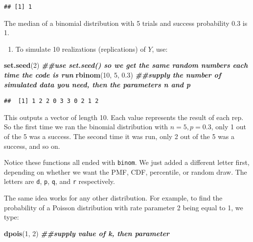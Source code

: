 \documentclass[
]{book}
\newenvironment{Shaded}{\begin{snugshade}}{\end{snugshade}}
\newcommand{\DecValTok}[1]{\textcolor[rgb]{0.00,0.00,0.81}{#1}}
\newcommand{\DocumentationTok}[1]{\textcolor[rgb]{0.56,0.35,0.01}{\textbf{\textit{#1}}}}
\newcommand{\FloatTok}[1]{\textcolor[rgb]{0.00,0.00,0.81}{#1}}
\newcommand{\FunctionTok}[1]{\textcolor[rgb]{0.13,0.29,0.53}{\textbf{#1}}}
\newcommand{\NormalTok}[1]{#1}
\providecommand{\tightlist}{%
  \setlength{\itemsep}{0pt}\setlength{\parskip}{0pt}}
\begin{document}
\begin{verbatim}
## [1] 1
\end{verbatim}

The median of a binomial distribution with 5 trials and success probability 0.3 is 1.

\begin{enumerate}
\def\labelenumi{\arabic{enumi}.}
\setcounter{enumi}{3}
\tightlist
\item
  To simulate 10 realizations (replications) of \(Y\), use:
\end{enumerate}

\begin{Shaded}
\begin{Highlighting}[]
\FunctionTok{set.seed}\NormalTok{(}\DecValTok{2}\NormalTok{) }\DocumentationTok{\#\#use set.seed() so we get the same random numbers each time the code is run}
\FunctionTok{rbinom}\NormalTok{(}\DecValTok{10}\NormalTok{, }\DecValTok{5}\NormalTok{, }\FloatTok{0.3}\NormalTok{) }\DocumentationTok{\#\#supply the number of simulated data you need, then the parameters n and p}
\end{Highlighting}
\end{Shaded}

\begin{verbatim}
##  [1] 1 2 2 0 3 3 0 2 1 2
\end{verbatim}

This outputs a vector of length 10. Each value represents the result of each rep. So the first time we ran the binomial distribution with \(n=5, p=0.3\), only 1 out of the 5 was a success. The second time it was run, only 2 out of the 5 was a success, and so on.

Notice these functions all ended with \texttt{binom}. We just added a different letter first, depending on whether we want the PMF, CDF, percentile, or random draw. The letters are \texttt{d}, \texttt{p}, \texttt{q}, and \texttt{r} respectively.

The same idea works for any other distribution. For example, to find the probability of a Poisson distribution with rate parameter 2 being equal to 1, we type:

\begin{Shaded}
\begin{Highlighting}[]
\FunctionTok{dpois}\NormalTok{(}\DecValTok{1}\NormalTok{, }\DecValTok{2}\NormalTok{) }\DocumentationTok{\#\#supply value of k, then parameter}
\end{Highlighting}
\end{Shaded}
\end{document}
